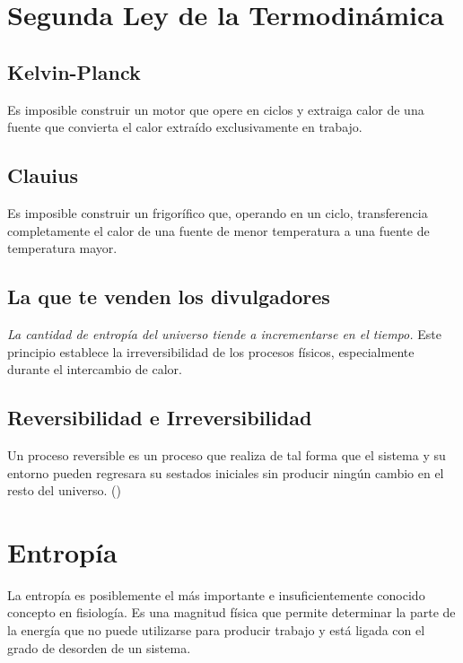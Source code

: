 \chapter{Segunda Ley de la Termodinámica}

\section{Kelvin-Planck}
Es imposible construir un motor que opere en ciclos y extraiga calor de una fuente que convierta el calor extraído exclusivamente en trabajo.

\section{Clauius}
Es imposible construir un frigorífico que, operando en un ciclo, transferencia completamente el calor de una fuente de menor temperatura a una fuente de temperatura mayor.


\section{La que te venden los divulgadores}
\textit{La cantidad de entropía del universo tiende a incrementarse en el tiempo.} Este principio establece la irreversibilidad de los procesos físicos, especialmente durante el intercambio de calor.

\section{Reversibilidad e Irreversibilidad}
Un proceso reversible es un proceso que realiza de tal forma que el sistema y su entorno pueden regresara su sestados iniciales sin producir ningún cambio en el resto del universo. ()



\chapter{Entropía}

La entropía es posiblemente el más importante e insuficientemente conocido concepto en fisiología. Es una magnitud física que permite determinar la parte de la energía que no puede utilizarse para producir trabajo y está ligada con el grado de desorden de un sistema.


